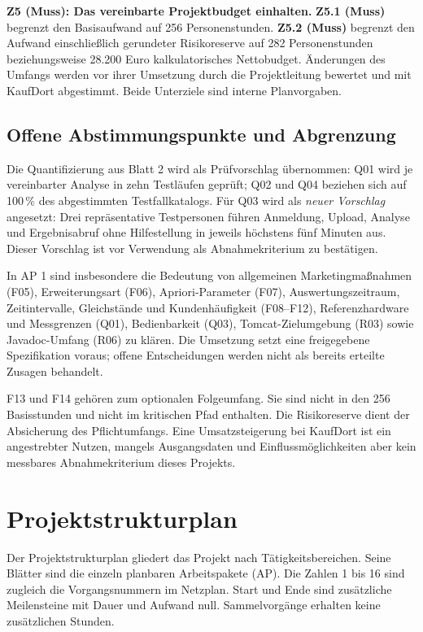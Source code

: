 \documentclass[a4paper,10pt]{article}
\begin{document}
\textbf{Z5 (Muss): Das vereinbarte Projektbudget einhalten.} \textbf{Z5.1 (Muss)} begrenzt den Basisaufwand auf 256 Personenstunden. \textbf{Z5.2 (Muss)} begrenzt den Aufwand einschlie\ss{}lich gerundeter Risikoreserve auf 282 Personenstunden beziehungsweise 28.200 Euro kalkulatorisches Nettobudget. Änderungen des Umfangs werden vor ihrer Umsetzung durch die Projektleitung bewertet und mit KaufDort abgestimmt. Beide Unterziele sind interne Planvorgaben.

\subsection*{Offene Abstimmungspunkte und Abgrenzung}
Die Quantifizierung aus Blatt 2 wird als Prüfvorschlag übernommen: Q01 wird je vereinbarter Analyse in zehn Testläufen geprüft; Q02 und Q04 beziehen sich auf 100\,\% des abgestimmten Testfallkatalogs. Für Q03 wird als \emph{neuer Vorschlag} angesetzt: Drei repräsentative Testpersonen führen Anmeldung, Upload, Analyse und Ergebnisabruf ohne Hilfestellung in jeweils höchstens fünf Minuten aus. Dieser Vorschlag ist vor Verwendung als Abnahmekriterium zu bestätigen.

In AP 1 sind insbesondere die Bedeutung von \glqq allgemeinen Marketingma\ss{}nahmen\grqq{} (F05), Erweiterungsart (F06), Apriori-Parameter (F07), Auswertungszeitraum, Zeitintervalle, Gleichstände und Kundenhäufigkeit (F08--F12), Referenzhardware und Messgrenzen (Q01), Bedienbarkeit (Q03), Tomcat-Zielumgebung (R03) sowie Javadoc-Umfang (R06) zu klären. Die Umsetzung setzt eine freigegebene Spezifikation voraus; offene Entscheidungen werden nicht als bereits erteilte Zusagen behandelt.

F13 und F14 gehören zum optionalen Folgeumfang. Sie sind nicht in den 256 Basisstunden und nicht im kritischen Pfad enthalten. Die Risikoreserve dient der Absicherung des Pflichtumfangs. Eine Umsatzsteigerung bei KaufDort ist ein angestrebter Nutzen, mangels Ausgangsdaten und Einflussmöglichkeiten aber kein messbares Abnahmekriterium dieses Projekts.

\clearpage
\section*{Projektstrukturplan}
Der Projektstrukturplan gliedert das Projekt nach Tätigkeitsbereichen. Seine Blätter sind die einzeln planbaren Arbeitspakete (AP). Die Zahlen 1 bis 16 sind zugleich die Vorgangsnummern im Netzplan. Start und Ende sind zusätzliche Meilensteine mit Dauer und Aufwand null. Sammelvorgänge erhalten keine zusätzlichen Stunden.
\end{document}
